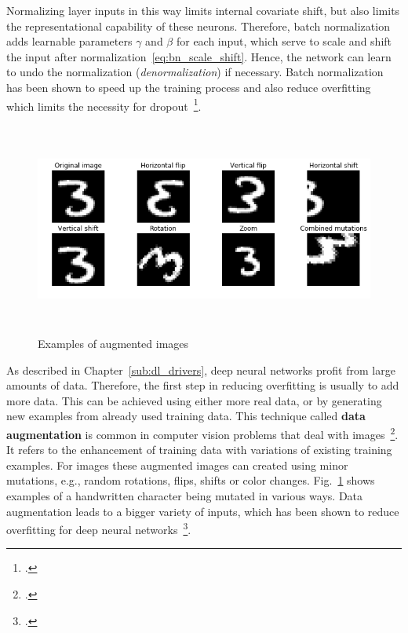 Normalizing layer inputs in this way limits internal covariate shift, but also
limits the representational capability of these neurons.
Therefore, batch normalization adds learnable parameters $\gamma$ and $\beta$ for
each input, which serve to scale and shift the input after normalization~\ref{eq:bn_scale_shift}.
Hence, the network can learn to undo the normalization (\textit{denormalization})
if necessary.
Batch normalization has been shown to speed up the training process and also
reduce overfitting which limits the necessity for dropout~\footcite{Ioffe2015}.

\begin{figure}[h]
  \centering
  \includegraphics[height=7cm]{img/data_augmentation}
  \caption{Examples of augmented images}
\label{fig:augmented_images}
\end{figure}

As described in Chapter~\ref{sub:dl_drivers}, deep neural networks profit from
large amounts of data.
Therefore, the first step in reducing overfitting is usually to add
more data.
This can be achieved using either more real data, or by generating new examples
from already used training data.
This technique called \textbf{data augmentation} is common in computer vision
problems that deal with images~\footcite{Simard2003}.
It refers to the enhancement of training data with variations of existing training
examples.
For images these augmented images can created using minor mutations, e.g., random rotations, flips, shifts or
color changes.
Fig.~\ref{fig:augmented_images} shows examples of a handwritten character being
mutated in various ways.
Data augmentation leads to a bigger variety of inputs, which has been shown
to reduce overfitting for deep neural networks~\footcite{Krizhevsky2012}.
